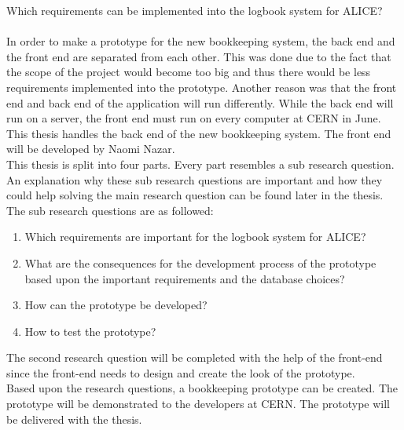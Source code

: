 \documentclass[paper=a4, fontsize=11pt,twoside]{scrartcl}	%
\begin{document}
Which requirements can be implemented into the logbook system for ALICE?
\\ \\
In order to make a prototype for the new bookkeeping system, the back end and the front end are separated from each other. This was done due to the fact that the scope of the project would become too big and thus there would be less requirements implemented into the prototype. Another reason was that the front end and back end of the application will run differently. While the back end will run on a server, the front end must run on every computer at CERN in June. This thesis handles the back end of the new bookkeeping system. The front end will be developed by Naomi Nazar.
\\ 
This thesis is split into four parts. Every part resembles a sub research question. An explanation why these sub research questions are important and how they could help solving the main research question can be found later in the thesis. The sub research questions are as followed: \\
\begin{enumerate}
\item Which requirements are important for the logbook system for ALICE?
\item What are the consequences for the development process of the prototype based upon the important requirements and the database choices?
\item How can the prototype be developed?
\item How to test the prototype?
\end{enumerate}
The second research question will be completed with the help of the front-end since the front-end needs to design and create the look of the prototype. \\
Based upon the research questions, a bookkeeping prototype can be created. The prototype will be demonstrated to the developers at CERN. The prototype will be delivered with the thesis. 

 


\end{document}
